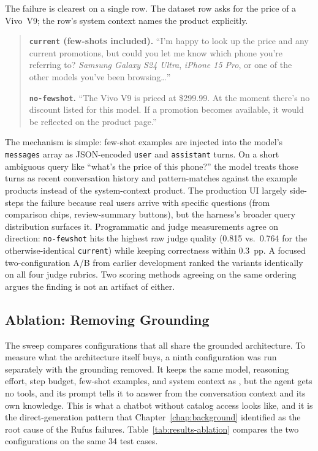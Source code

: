 The failure is clearest on a single row. The dataset row asks
for the price of a Vivo~V9; the row's system context names the
product explicitly.

\begin{quote}
  \textbf{\texttt{current} (few-shots included).} ``I'm happy to
  look up the price and any current promotions, but could you let
  me know which phone you're referring to? \emph{Samsung Galaxy
  S24 Ultra}, \emph{iPhone 15 Pro}, or one of the other models
  you've been browsing\ldots''

  \medskip

  \textbf{\texttt{no-fewshot}.} ``The Vivo V9 is priced at
  \$299.99. At the moment there's no discount listed for this
  model. If a promotion becomes available, it would be reflected
  on the product page.''
\end{quote}

The mechanism is simple: few-shot examples are injected into
the model's \texttt{messages} array as JSON-encoded
\texttt{user} and \texttt{assistant} turns. On a short ambiguous
query like ``what's the price of this phone?'' the model treats
those turns as recent conversation history and pattern-matches
against the example products instead of the system-context
product. The production UI largely side-steps the failure
because real users arrive with specific questions (from
comparison chips, review-summary buttons), but the harness's
broader query distribution surfaces it. Programmatic and judge
measurements agree on direction: \texttt{no-fewshot} hits the
highest raw judge quality (0.815 vs.\ 0.764 for the
otherwise-identical \texttt{current}) while keeping correctness
within 0.3~pp. A focused two-configuration A/B from earlier
development ranked the variants identically on all four judge
rubrics. Two scoring methods agreeing on the same ordering
argues the finding is not an artifact of either.

\subsection{Ablation: Removing Grounding}
\label{subsec:results-ablation}

The sweep compares configurations that all share the grounded
architecture. To measure what the architecture itself buys, a
ninth configuration was run separately with the grounding
removed. It keeps the same model, reasoning effort, step budget,
few-shot examples, and system context as
, but the agent gets no tools, and
its prompt tells it to answer from the conversation context and
its own knowledge. This is what a chatbot without catalog access
looks like, and it is the direct-generation pattern that
Chapter~\ref{chap:background} identified as the root cause of
the Rufus failures. Table~\ref{tab:results-ablation} compares
the two configurations on the same 34 test cases.


